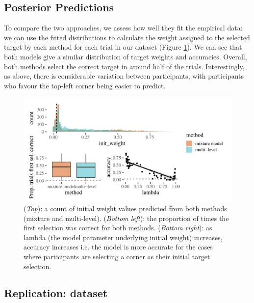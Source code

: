 \documentclass[preprints, article,submit,pdftex,moreauthors]{Definitions/mdpi}
\begin{document}
\subsection{Posterior Predictions}

To compare the two approaches, we assess how well they fit the empirical data: we can use the fitted distributions to calculate the weight assigned to the selected target by each method for each trial in our dataset (Figure \ref{fig:qjep_init_sel_pred}). We can see that both models give a similar distribution of target weights and accuracies. Overall, both methods  select the correct target in around half of the trials. Interestingly, as above, there is considerable variation between participants, with participants who favour the top-left corner being easier to predict. 

\begin{figure}[H]
\centering
\includegraphics[width=12 cm]{Figures/qjep_init_sel_preds.pdf}
\caption{(\textit{Top}): a count of initial weight values predicted from both methods (mixture and multi-level). (\textit{Bottom left}): the proportion of times the first selection was correct for both methods.  (\textit{Bottom right}): as lambda (the model parameter underlying initial weight) increases, accuracy increases i.e. the model is more accurate for the cases where participants are selecting a corner as their initial target selection.} 
\label{fig:qjep_init_sel_pred}
\end{figure} 

\subsection{Replication: \cite{kristjansson2014} dataset}
\end{document}
